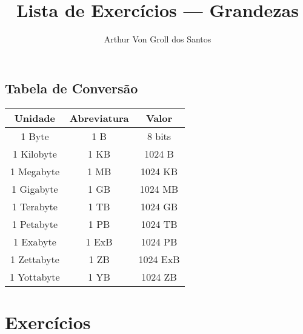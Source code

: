 \documentclass{article}
\author{Arthur Von Groll dos Santos}
\title{Lista de Exercícios --- Grandezas}
\begin{document}
\maketitle

\subsection*{\centering Tabela de Conversão}

\begin{center}
    \begin{tabular}{| c | c | c |}
        \hline
        Unidade & Abreviatura & Valor \\
        \hline
        1 Byte & 1 B & 8 bits \\
        \hline
        1 Kilobyte & 1 KB & 1024 B \\
        \hline
        1 Megabyte & 1 MB & 1024 KB \\
        \hline
        1 Gigabyte & 1 GB & 1024 MB \\
        \hline
        1 Terabyte & 1 TB & 1024 GB \\
        \hline
        1 Petabyte & 1 PB & 1024 TB \\
        \hline
        1 Exabyte & 1 ExB & 1024 PB \\
        \hline
        1 Zettabyte & 1 ZB & 1024 ExB \\
        \hline
        1 Yottabyte & 1 YB & 1024 ZB \\
        \hline
    \end{tabular}
\end{center}

\section*{\centering Exercícios}
\end{document}
